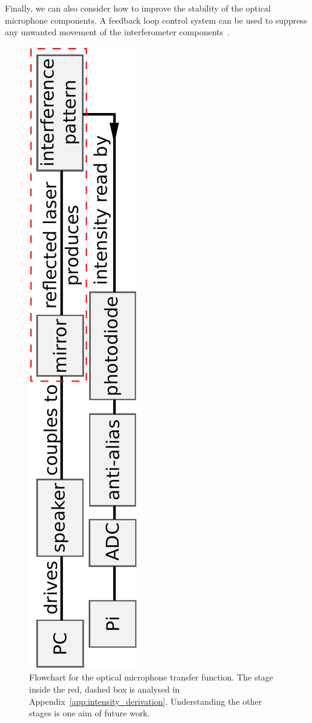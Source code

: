 \documentclass[paper-main.tex]{subfiles}
\begin{document}
Finally, we can also consider how to improve the stability of the optical microphone components.
A feedback loop control system can be used to suppress any unwanted movement of the interferometer components~\citep{abbott2017exploring, Sekiguchi:2016bmv, verhoeven2009robust}. 



\begin{figure}
	\includegraphics[height=.99\textwidth, angle=-90]{figures/pipeline.pdf}
	\caption{
Flowchart for the optical microphone transfer function. 
The stage inside the red, dashed box is analysed in Appendix~\ref{app:intensity_derivation}. Understanding the other stages is one aim of future work. 
}
	\label{fig:pipeline_highlighted}
\end{figure}
\end{document}
